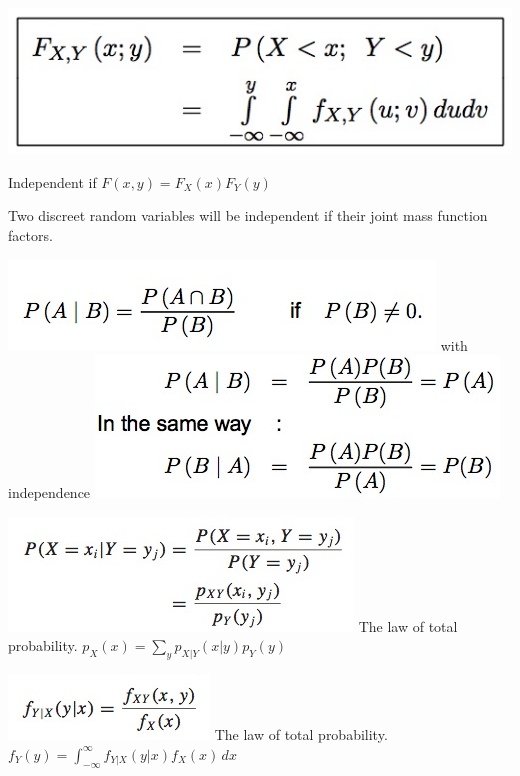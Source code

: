 \documentclass{/out/app/latex/examnotes}
\begin{document}
{


\includegraphics[scale=0.4]{./img/3con4.jpg}                                         


Independent if $F(x,y)=F_X(x)F_Y(y)$

Two discreet random variables will be independent if their joint mass function factors.


\includegraphics[scale=0.5]{./img/354.jpg}
\ra with independence 
\includegraphics[scale=0.5]{./img/353.jpg}

\vspace{6pt}
\includegraphics[scale=0.5]{./img/351.jpg}
The law of total probability. $p_X(x)=\displaystyle\sum_y{p_{X|Y}(x|y)p_Y(y)}$

\includegraphics[scale=0.5]{./img/352.jpg}
The law of total probability. $f_Y(y)=\displaystyle\int_{-\infty}^\infty{f_{Y|X}(y|x)f_X(x)\,dx}$

}
\end{document}
